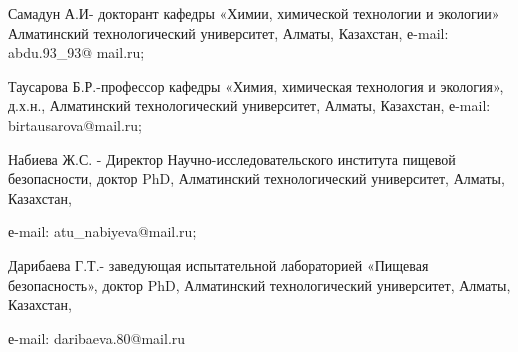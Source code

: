 \begin{noparindent}
Самадун А.И- докторант кафедры «Химии, химической технологии и экологии»
Алматинский технологический университет, Алматы, Казахстан, е-mail:
abdu.93\_93@ mail.ru;

Таусарова Б.Р.-профессор кафедры «Химия, химическая технология и
экология», д.х.н., Алматинский технологический университет, Алматы,
Казахстан, е-mail: birtausarova@mail.ru;

Набиева Ж.С. - Директор Научно-исследовательского института пищевой
безопасности, доктор PhD, Алматинский технологический университет,
Алматы, Казахстан,

е-mail: atu\_nabiyeva@mail.ru;

Дарибаева Г.Т.- заведующая испытательной лабораторией «Пищевая
безопасность», доктор PhD, Алматинский технологический университет,
Алматы, Казахстан,

е-mail: daribaeva.80@mail.ru
\end{noparindent}
